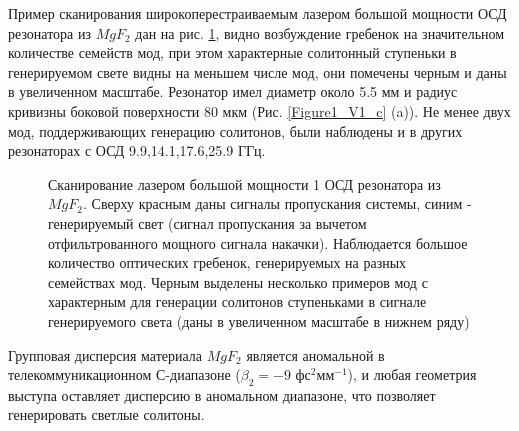 Пример сканирования широкоперестраиваемым лазером большой мощности ОСД резонатора из $MgF_2$ дан на рис. \ref{Scan_SolitonSpot}, видно возбуждение гребенок на значительном количестве семейств мод, при этом характерные солитонный ступеньки в генерируемом свете видны на меньшем числе мод, они помечены черным и даны в увеличенном масштабе. Резонатор имел диаметр около 5.5 мм и радиус кривизны боковой поверхности 80 мкм (Рис. \ref{Figure1_V1_c} (a)). Не менее двух мод, поддерживающих генерацию солитонов, были наблюдены и в других резонаторах с ОСД 9.9,14.1,17.6,25.9 ГГц.

\begin{figure}[ht]
\begin{minipage}[ht]{1\linewidth}
\end{minipage}
\caption{Сканирование лазером большой мощности 1 ОСД резонатора из $MgF_2$. Сверху красным даны сигналы пропускания системы, синим - генерируемый свет (сигнал пропускания за вычетом отфильтрованного мощного сигнала накачки). Наблюдается большое количество оптических гребенок, генерируемых на разных семействах мод. Черным выделены несколько примеров мод с характерным для генерации солитонов ступеньками в сигнале генерируемого света (даны в увеличенном масштабе в нижнем ряду)}
\label{Scan_SolitonSpot}
\end{figure}

Групповая дисперсия материала $MgF_2$ является аномальной в телекоммуникационном С-диапазоне ($\beta_2=-9$ фс$^2$мм$^{-1}$), и любая геометрия выступа оставляет дисперсию в аномальном диапазоне, что позволяет генерировать светлые солитоны.

